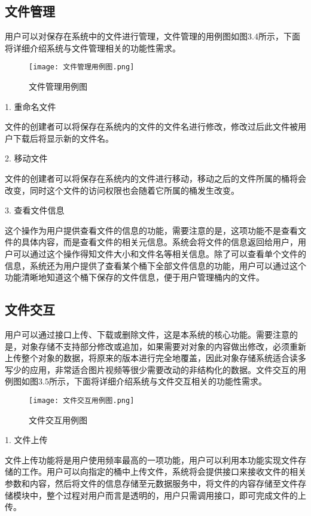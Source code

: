 \subsection{文件管理}
用户可以对保存在系统中的文件进行管理，文件管理的用例图如图3.4所示，下面将详细介绍系统与文件管理相关的功能性需求。

\begin{figure}[h]
    \centering
    \texttt{[image: 文件管理用例图.png]}
    \caption{文件管理用例图}
\end{figure}

1. 重命名文件

文件的创建者可以将保存在系统内的文件的文件名进行修改，修改过后此文件被用户下载后将显示新的文件名。

2. 移动文件

文件的创建者可以将保存在系统内的文件进行移动，移动之后的文件所属的桶将会改变，同时这个文件的访问权限也会随着它所属的桶发生改变。

3. 查看文件信息

这个操作为用户提供查看文件的信息的功能，需要注意的是，这项功能不是查看文件的具体内容，而是查看文件的相关元信息。系统会将文件的信息返回给用户，用户可以通过这个操作得知文件大小和文件名等相关信息。除了可以查看单个文件的信息，系统还为用户提供了查看某个桶下全部文件信息的功能，用户可以通过这个功能清晰地知道这个桶下保存的文件信息，便于用户管理桶内的文件。

\subsection{文件交互}
用户可以通过接口上传、下载或删除文件，这是本系统的核心功能。需要注意的是，对象存储不支持部分修改或追加，如果需要对对象的内容做出修改，必须重新上传整个对象的数据，将原来的版本进行完全地覆盖，因此对象存储系统适合读多写少的应用，非常适合图片视频等很少需要改动的非结构化的数据。文件交互的用例图如图3.5所示，下面将详细介绍系统与文件交互相关的功能性需求。

\begin{figure}[h]
    \centering
    \texttt{[image: 文件交互用例图.png]}
    \caption{文件交互用例图}
\end{figure}

1. 文件上传

文件上传功能将是用户使用频率最高的一项功能，用户可以利用本功能实现文件存储的工作。用户可以向指定的桶中上传文件，系统将会提供接口来接收文件的相关参数和内容，然后将文件的信息存储至元数据服务中，将文件的内容存储至文件存储模块中，整个过程对用户而言是透明的，用户只需调用接口，即可完成文件的上传。

